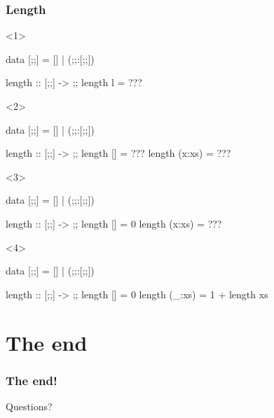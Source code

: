 \documentclass[17pt]{beamer}
\renewcommand{\(}[1]{\begin{columns}[#1]}
\renewcommand{\)}{\end{columns}}
\newcommand{\<}[1]{\begin{column}{#1}}
\renewcommand{\>}{\end{column}}
\begin{document}
\begin{frame}[fragile]
\frametitle{Length}
\begin{minipage}[t][.4\textheight]{\textwidth}
\begin{onlyenv}<1>
  \begin{code}
    data [;;] = [] | (;;:[;;])

    length :: [;;] -> ;;
    length l = ???
  \end{code}
\end{onlyenv}
\begin{onlyenv}<2>
  \begin{code}
    data [;;] = [] | (;;:[;;])

    length :: [;;] -> ;;
    length []     = ???
    length (x:xs) = ???
  \end{code}
\end{onlyenv}
\begin{onlyenv}<3>
  \begin{code}
    data [;;] = [] | (;;:[;;])

    length :: [;;] -> ;;
    length []     = 0
    length (x:xs) = ???
  \end{code}
\end{onlyenv}
\begin{onlyenv}<4>
  \begin{code}
    data [;;] = [] | (;;:[;;])

    length :: [;;] -> ;;
    length []     = 0
    length (_:xs) = 1 + length xs
  \end{code}
\end{onlyenv}
\end{minipage}
\begin{minipage}[c][.3\textheight]{\textwidth}
\begin{center}
\end{center}
\end{minipage}
\end{frame}




\section{The end}

\begin{frame}
  \frametitle{The end!}
  \begin{center}
    Questions?
  \end{center}
\end{frame}
\end{document}
